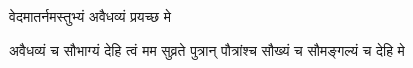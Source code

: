 

{वेदमातर्नमस्तुभ्यं अवैधव्यं प्रयच्छ मे}

{अवैधव्यं च सौभाग्यं देहि त्वं मम सुव्रते}
{पुत्रान् पौत्रांश्च सौख्यं च सौमङ्गल्यं च देहि मे}‌\closesection
